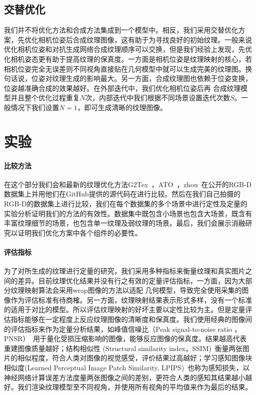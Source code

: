 \subsection{交替优化}
我们并不将优化方法和合成方法集成到一个模型中。相反，我们采用交替优化方案，先优化相机位姿后合成纹理图像，这有助于为寻找良好的初始纹理。一般来说优化相机位姿和对抗生成网络合成纹理顺序可以交换，但是我们经验上发现，先优化相机姿态更有助于提高纹理的保真度。一方面是相机位姿是纹理映射的核心，若相机位姿完全无误差则不同视角直接贴在几何模型中就可以生成完美的纹理图。换句话说，位姿对纹理生成的影响最大。另一方面，合成纹理图也依赖于位姿变换，位姿越准确合成的效果越好。在外部迭代中，我们优化相机位姿后再
合成纹理模型并且整个优化过程重复$N$次，内部迭代中我们根据不同场景设置迭代次数$S$。一般情况下我们设置$N = 1$，即可生成清晰的纹理图像。


\section{实验}
\paragraph*{比较方法}
在这个部分我们会和最新的纹理优化方法G2Tex~\cite{fu2018texture}，ATO~\cite{JingweiHuang2020AdversarialTO}，zhou~\cite{zhou2014color}在公开的RGB-D数据集上并用他们在GitHub提供的源代码在进行比较。然后在我们自己拍摄的RGB-D的数据集上进行比较，我们在每个数据集的多个场景中进行定性及定量的实验分析证明我们的方法的有效性。数据集中既包含小场景也包含大场景，既含有丰富纹理细节的场景，也包含单一纹理及弱纹理的场景。最后，我们会展示消融研究以证明我们优化方案中各个组件的必要性。

\paragraph*{评估指标}

为了对所生成的纹理进行定量的研究，我们采用多种指标来衡量纹理和真实图片之间的差异。目前纹理优化结果并没有行之有效的定量评估指标，一方面，因为大部分纹理映射算法会采用wrap图像的方法以适配
几何模型，导致完全使用采集的图像作为评估标准有待商榷。另一方面，纹理映射结果表示形式多样，没有一个标准的适用于对比的模型。所以评估纹理映射的好坏主要以定性比较为主。但是定量评估指标能够在一定程度上反应纹理图像的清晰度和保真度。我们使用经典的图像间的评估指标来作为定量分析结果，如峰值信噪比（Peak signal-to-noise ratio ，PNSR）~\cite{de2003improved}用于量化受损压缩影响的图像，能够反应图像的保真度。结果越高代表重建图像质量越好；结构相似性 (Structural similarity index，SSIM)~\cite{brunet2011mathematical}衡量两张图片的相似程度，符合人类对图像的视觉感受，评价结果过高越好；学习感知图像块相似度(Learned Perceptual Image Patch Similarity, LPIPS)~\cite{zhang2018unreasonable}也称为感知损失，以神经网络计算误差方法度量两张图像之间的差别，更符合人类的感知其结果越小越好。我们渲染纹理模型至不同视角，并使用所有视角的平均值来作为最后的结果。


